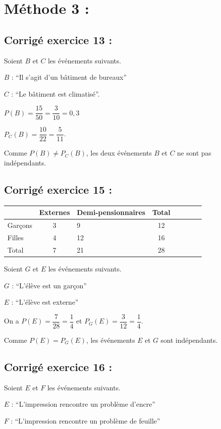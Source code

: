 \documentclass[12pt,a4paper]{book}
\begin{document}
\section*{Méthode 3 :}

\subsection*{Corrigé exercice 13 :}

Soient $B$ et $C$ les événements suivants.

$B$ : “Il s'agit d'un bâtiment de bureaux”

$C$ : “Le bâtiment est climatisé”.

$P(B)=\dfrac{15}{50}=\dfrac{3}{10}=0,3$

$P_C(B)=\dfrac{10}{22}=\dfrac{5}{11}$.

Comme $P(B)\neq P_C(B)$, les deux événements $B$ et $C$ ne sont pas indépendants.

\subsection*{Corrigé exercice 15 :}

\begin{tabular}{ | Xc | Xc | Xc | Xc | }
	\hline	& Externes & Demi-pensionnaires & Total\\ \hline
	Garçons & 3 & 9 & 12\\ \hline
	Filles & 4 & 12 & 16\\ \hline
	Total & 7 & 21 & 28\\ \hline
\end{tabular}

Soient $G$ et $E$ les événements suivants.

$G$ : “L'élève est un garçon”

$E$ : “L'élève est externe”

On a $P(E)=\dfrac{7}{28}=\dfrac{1}{4}$ et $P_G(E)=\dfrac{3}{12}=\dfrac{1}{4}$.

Comme $P(E)=P_G(E)$, les événements $E$ et $G$ sont indépendants.

\subsection*{Corrigé exercice 16 :}

Soient $E$ et $F$ les événements suivants.

$E$ : “L'impression rencontre un problème d'encre”

$F$ : “L'impression rencontre un problème de feuille”
\end{document}
